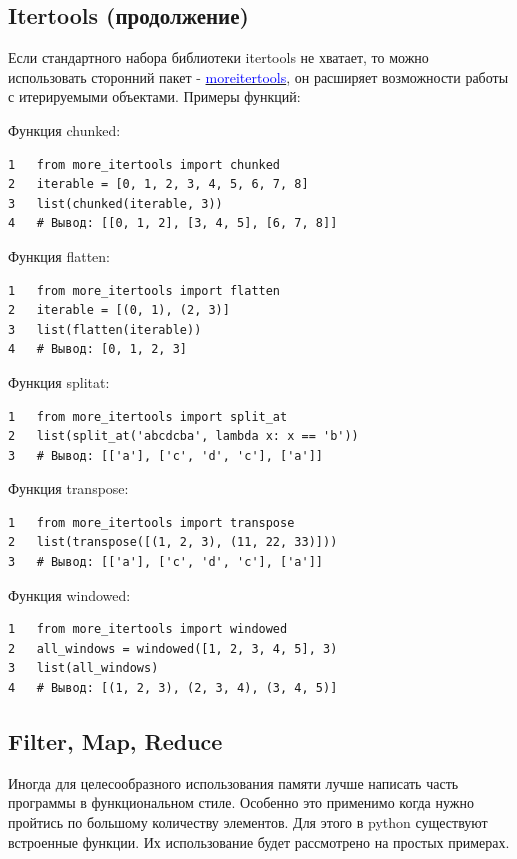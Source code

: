 \documentclass[12pt, a4paper]{article}
\begin{document}
\subsection{Itertools (продолжение)}

Если стандартного набора библиотеки itertools не хватает,
то можно использовать сторонний пакет - 
\href{https://more-itertools.readthedocs.io/en/stable/api.html}
{\textcolor{blue}{more\textunderscore itertools}}, он расширяет
возможности работы с итерируемыми объектами. Примеры функций:

\vspace{1em}

Функция chunked:
\begin{verbatim}
1   from more_itertools import chunked
2   iterable = [0, 1, 2, 3, 4, 5, 6, 7, 8]
3   list(chunked(iterable, 3))
4   # Вывод: [[0, 1, 2], [3, 4, 5], [6, 7, 8]]
\end{verbatim}

Функция flatten:
\begin{verbatim}
1   from more_itertools import flatten
2   iterable = [(0, 1), (2, 3)]
3   list(flatten(iterable))
4   # Вывод: [0, 1, 2, 3]
\end{verbatim}

Функция split\textunderscore at:
\begin{verbatim}
1   from more_itertools import split_at
2   list(split_at('abcdcba', lambda x: x == 'b'))
3   # Вывод: [['a'], ['c', 'd', 'c'], ['a']]
\end{verbatim}

Функция transpose:
\begin{verbatim}
1   from more_itertools import transpose
2   list(transpose([(1, 2, 3), (11, 22, 33)]))
3   # Вывод: [['a'], ['c', 'd', 'c'], ['a']]
\end{verbatim}

Функция windowed:
\begin{verbatim}
1   from more_itertools import windowed
2   all_windows = windowed([1, 2, 3, 4, 5], 3)
3   list(all_windows)
4   # Вывод: [(1, 2, 3), (2, 3, 4), (3, 4, 5)]
\end{verbatim}

\subsection{Filter, Map, Reduce}

Иногда для целесообразного использования памяти лучше 
написать часть программы в функциональном стиле. 
Особенно это применимо когда нужно пройтись по большому 
количеству элементов. Для этого в python существуют встроенные
функции. Их использование будет рассмотрено на простых примерах.
\end{document}

